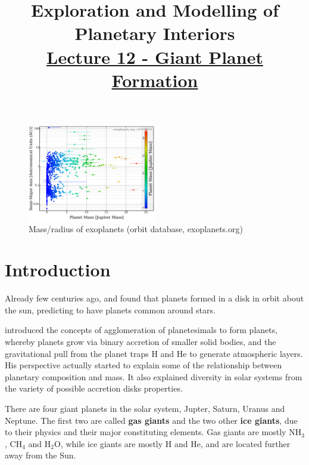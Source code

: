 \documentclass[12pt]{article} %
\title{\large{\vspace{-5ex}\textbf{Exploration and Modelling of Planetary Interiors}}\newline\\{\textbf{\underline{Lecture 12 - Giant Planet Formation}}}\vspace{-7ex}}
\author{}
\date{} %
\begin{document}
\begingroup
\let\center\flushleft
\let\endcenter\endflushleft
\maketitle
\endgroup

\begingroup
\let\cleardoublepage\relax
\let\clearpage\relax
\tableofcontents
\endgroup

\begin{figure}
\begin{center}
 \includegraphics[width=0.5\textwidth,keepaspectratio=true]{./images/exoplanets}
 \caption{Mass/radius of exoplanets (orbit database, exoplanets.org)}
 \label{exoplanets}
\end{center}
\end{figure}


\section{Introduction}\vspace{-2ex}\titlerule[1pt]\bigskip

\noindent Already few centuries ago, \cite{kant1755allgemeine} and \cite{laplace1796exposition} found that planets formed in a disk in orbit about the sun, predicting to have planets common around stars. \newline

\noindent \cite{chamberlin1909development} introduced the concepts of agglomeration of planetesimals to form planets, whereby planets grow via binary accretion of smaller solid bodies, and the gravitational pull from the planet traps H and He to generate atmospheric layers. His perspective actually started to explain some of the relationship between planetary composition and mass. It also explained diversity in solar systems from the variety of possible accretion disks properties. \newline

\noindent There are four giant planets in the solar system, Jupter, Saturn, Uranus and Neptune. The first two are called \textbf{gas giants} and the two other \textbf{ice giants}, due to their physics and their major constituting elements. Gas giants are mostly NH$_3$, CH$_4$ and H$_2$O, while ice giants are mostly H and He, and are located further away from the Sun.
\end{document}

